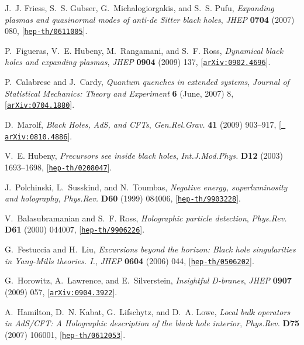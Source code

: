 \documentclass[12pt]{article}
\begin{document}
\begin{thebibliography}{100}
J.~J. Friess, S.~S. Gubser, G.~Michalogiorgakis, and S.~S. Pufu, {\it
  {Expanding plasmas and quasinormal modes of anti-de Sitter black holes}},
  {\em JHEP} {\bf 0704} (2007) 080,
  [\href{http://xxx.lanl.gov/abs/hep-th/0611005}{{\tt hep-th/0611005}}].

P.~Figueras, V.~E. Hubeny, M.~Rangamani, and S.~F. Ross, {\it {Dynamical black
  holes and expanding plasmas}},  {\em JHEP} {\bf 0904} (2009) 137,
  [\href{http://xxx.lanl.gov/abs/0902.4696}{{\tt arXiv:0902.4696}}].

P.~{Calabrese} and J.~{Cardy}, {\it {Quantum quenches in extended systems}},
  {\em Journal of Statistical Mechanics: Theory and Experiment} {\bf 6} (June,
  2007) 8, [\href{http://xxx.lanl.gov/abs/0704.1880}{{\tt arXiv:0704.1880}}].

D.~Marolf, {\it {Black Holes, AdS, and CFTs}},  {\em Gen.Rel.Grav.} {\bf 41}
  (2009) 903--917, [\href{http://xxx.lanl.gov/abs/0810.4886}{{\tt
  arXiv:0810.4886}}].

V.~E. Hubeny, {\it {Precursors see inside black holes}},  {\em Int.J.Mod.Phys.}
  {\bf D12} (2003) 1693--1698,
  [\href{http://xxx.lanl.gov/abs/hep-th/0208047}{{\tt hep-th/0208047}}].

J.~Polchinski, L.~Susskind, and N.~Toumbas, {\it {Negative energy,
  superluminosity and holography}},  {\em Phys.Rev.} {\bf D60} (1999) 084006,
  [\href{http://xxx.lanl.gov/abs/hep-th/9903228}{{\tt hep-th/9903228}}].

V.~Balasubramanian and S.~F. Ross, {\it {Holographic particle detection}},
  {\em Phys.Rev.} {\bf D61} (2000) 044007,
  [\href{http://xxx.lanl.gov/abs/hep-th/9906226}{{\tt hep-th/9906226}}].

G.~Festuccia and H.~Liu, {\it {Excursions beyond the horizon: Black hole
  singularities in Yang-Mills theories. I.}},  {\em JHEP} {\bf 0604} (2006)
  044, [\href{http://xxx.lanl.gov/abs/hep-th/0506202}{{\tt hep-th/0506202}}].

G.~Horowitz, A.~Lawrence, and E.~Silverstein, {\it {Insightful D-branes}},
  {\em JHEP} {\bf 0907} (2009) 057,
  [\href{http://xxx.lanl.gov/abs/0904.3922}{{\tt arXiv:0904.3922}}].

A.~Hamilton, D.~N. Kabat, G.~Lifschytz, and D.~A. Lowe, {\it {Local bulk
  operators in AdS/CFT: A Holographic description of the black hole interior}},
   {\em Phys.Rev.} {\bf D75} (2007) 106001,
  [\href{http://xxx.lanl.gov/abs/hep-th/0612053}{{\tt hep-th/0612053}}].


\end{thebibliography}
\end{document}
